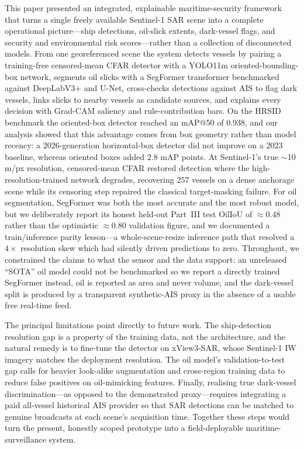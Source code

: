 \documentclass[a4paper,11pt]{article}
\begin{document}
This paper presented an integrated, explainable maritime-security framework that turns a
single freely available Sentinel-1 SAR scene into a complete operational picture---ship
detections, oil-slick extents, dark-vessel flags, and security and environmental risk
scores---rather than a collection of disconnected models. From one georeferenced scene the
system detects vessels by pairing a training-free censored-mean CFAR detector with a
YOLO11m oriented-bounding-box network, segments oil slicks with a SegFormer transformer
benchmarked against DeepLabV3+ and U-Net, cross-checks detections against AIS to flag dark
vessels, links slicks to nearby vessels as candidate sources, and explains every decision
with Grad-CAM saliency and rule-contribution bars. On the HRSID benchmark the oriented-box
detector reached an mAP@50 of $0.938$, and our analysis showed that this advantage comes
from box geometry rather than model recency: a $2026$-generation horizontal-box detector
did not improve on a $2023$ baseline, whereas oriented boxes added $2.8$ mAP points. At
Sentinel-1's true $\sim$10\,m/px resolution, censored-mean CFAR restored detection where
the high-resolution-trained network degrades, recovering $257$ vessels on a dense
anchorage scene while its censoring step repaired the classical target-masking failure.
For oil segmentation, SegFormer was both the most accurate and the most robust model, but
we deliberately report its honest held-out Part~III test OilIoU of $\approx0.48$ rather
than the optimistic $\approx0.80$ validation figure, and we documented a train/inference
parity lesson---a whole-scene-resize inference path that resolved a $4\times$ resolution
skew which had silently driven predictions to zero. Throughout, we constrained the claims
to what the sensor and the data support: an unreleased ``SOTA'' oil model could not be
benchmarked so we report a directly trained SegFormer instead, oil is reported as area and never volume, and the dark-vessel
split is produced by a transparent synthetic-AIS proxy in the absence of a usable free
real-time feed.

The principal limitations point directly to future work. The ship-detection
resolution gap is a property of the training data, not the architecture, and the natural
remedy is to fine-tune the detector on xView3-SAR, whose Sentinel-1 IW imagery matches the
deployment resolution. The oil model's validation-to-test gap calls for heavier
look-alike augmentation and cross-region training data to reduce false positives on
oil-mimicking features. Finally, realising true dark-vessel discrimination---as opposed to
the demonstrated proxy---requires integrating a paid all-vessel historical AIS provider so
that SAR detections can be matched to genuine broadcasts at each scene's acquisition time.
Together these steps would turn the present, honestly scoped prototype into a
field-deployable maritime-surveillance system.
\end{document}
